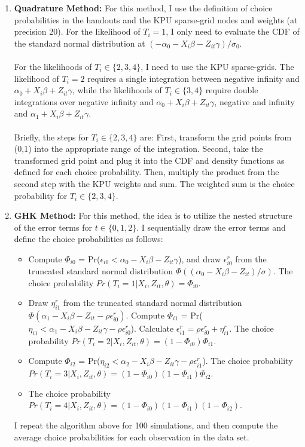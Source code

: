 \documentclass[12pt]{article}
\begin{document}
\begin{enumerate}
	\item \textbf{Quadrature Method:} For this method, I use the definition of choice probabilities in the handouts and the KPU sparse-grid nodes and weights (at precision 20). For the likelihood of $T_i = 1$, I only need to evaluate the CDF of the standard normal distribution at $(-\alpha_0 - X_i \beta - Z_{it} \gamma)/\sigma_0$. \\\\
	For the likelihoods of $T_i \in \{2, 3, 4\}$, I need to use the KPU sparse-grids. The likelihood of $T_i = 2$ requires a single integration between negative infinity and $\alpha_0 + X_i \beta + Z_{it} \gamma$, while the likelihoods of $T_i \in \{3, 4\}$ require double integrations over negative infinity and $\alpha_0 + X_i \beta + Z_{it} \gamma$, negative and infinity and $\alpha_1 + X_i \beta + Z_{it} \gamma$. \\\\
	Briefly, the steps for $T_i \in \{2, 3, 4\}$ are: First, transform the grid points from (0,1) into the appropriate range of the integration. Second, take the transformed grid point and plug it into the CDF and density functions as defined for each choice probability. Then, multiply the product from the second step with the KPU weights and sum. The weighted sum is the choice probability for $T_i \in \{2, 3, 4\}$.
	
	\item \textbf{GHK Method: } For this method, the idea is to utilize the nested structure of the error terms for $t \in \{0, 1, 2\}$. I sequentially draw the error terms and define the choice probabilities as follows:
		\begin{itemize}
			\item Compute $\Phi_{i0}$ = Pr($\epsilon_{i0} < \alpha_0 - X_i \beta - Z_{it} \gamma$), and draw $\epsilon_{i0}^r$ from the truncated standard normal distribution $\Phi((\alpha_0 - X_i \beta - Z_{it})/\sigma)$. The choice probability $Pr(T_i = 1 | X_i, Z_{it}, \theta) = \Phi_{i0}$.
			\item Draw $\eta_{i1}^r$ from the truncated standard normal distribution $\Phi(\alpha_1 - X_i \beta - Z_{it}- \rho \epsilon_{i0}^r)$. Compute $\Phi_{i1}$ = Pr($\eta_{i1} < \alpha_1 - X_i \beta - Z_{it} \gamma - \rho \epsilon_{i0}^r$). Calculate $\epsilon_{i1}^r = \rho \epsilon_{i0}^r + \eta_{i1}^r$. The choice probability $Pr(T_i = 2 | X_i, Z_{it}, \theta) = (1- \Phi_{i0}) \Phi_{i1}$. 
			\item Compute $\Phi_{i2}$ = Pr($\eta_{i2} < \alpha_2 - X_i \beta - Z_{it} \gamma - \rho \epsilon_{i1}^r$). The choice probability $Pr(T_i = 3 | X_i, Z_{it}, \theta) = (1- \Phi_{i0}) (1-\Phi_{i1}) \Phi_{i2}$. 
			\item The choice probability $Pr(T_i = 4 | X_i, Z_{it}, \theta) = (1- \Phi_{i0}) (1-\Phi_{i1}) (1-\Phi_{i2})$.
		\end{itemize}
	I repeat the algorithm above for 100 simulations, and then compute the average choice probabilities for each observation in the data set. 
	

\end{enumerate}
\end{document}
